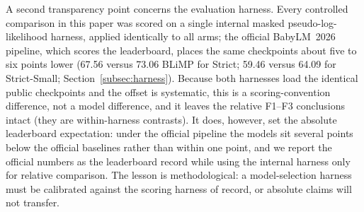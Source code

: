 A second transparency point concerns the evaluation harness. Every controlled comparison in this paper was scored on a single internal masked pseudo-log-likelihood harness, applied identically to all arms; the official BabyLM~2026 pipeline, which scores the leaderboard, places the same checkpoints about five to six points lower (67.56 versus 73.06 BLiMP for Strict; 59.46 versus 64.09 for Strict-Small; Section~\ref{subsec:harness}). Because both harnesses load the identical public checkpoints and the offset is systematic, this is a scoring-convention difference, not a model difference, and it leaves the relative F1--F3 conclusions intact (they are within-harness contrasts). It does, however, set the absolute leaderboard expectation: under the official pipeline the models sit several points below the official baselines rather than within one point, and we report the official numbers as the leaderboard record while using the internal harness only for relative comparison. The lesson is methodological: a model-selection harness must be calibrated against the scoring harness of record, or absolute claims will not transfer.

